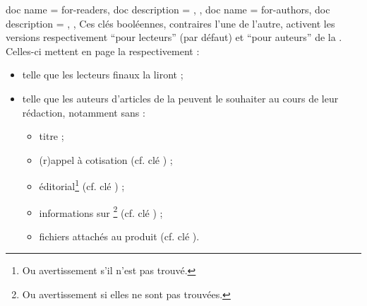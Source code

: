 \documentclass{letgut}
\begin{document}
\begin{docKeys}
  {
    {
      doc name = for-readers,
      doc description = {},
    },
    {
      doc name = for-authors,
      doc description = {},
    },
  }%
  Ces clés booléennes, contraires l'une de l'autre, activent les versions
  respectivement \enquote{pour lecteurs} (par défaut) et \enquote{pour auteurs}
  de la . Celles-ci mettent en page la  respectivement :
  \begin{itemize}
  \item telle que les lecteurs finaux la liront ;
  \item telle que les auteurs d'articles de la  peuvent le souhaiter au
    cours de leur rédaction, notamment sans :
    \begin{itemize}
    \item titre ;
    \item (r)appel à cotisation (cf. clé ) ;
    \item éditorial\footnote{Ou avertissement s'il n'est pas trouvé.} (cf. clé
      ) ;
    \item informations sur \gut{}\footnote{Ou avertissement si elles ne sont pas
        trouvées.}  (cf. clé ) ;
    \item fichiers attachés au \pdf{} produit (cf. clé
      ).
    \end{itemize}
  \end{itemize}
\end{docKeys}
\end{document}
